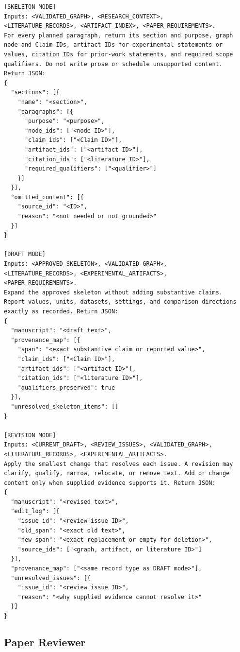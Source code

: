 \begin{lstlisting}
[SKELETON MODE]
Inputs: <VALIDATED_GRAPH>, <RESEARCH_CONTEXT>,
<LITERATURE_RECORDS>, <ARTIFACT_INDEX>, <PAPER_REQUIREMENTS>.
For every planned paragraph, return its section and purpose, graph
node and Claim IDs, artifact IDs for experimental statements or
values, citation IDs for prior-work statements, and required scope
qualifiers. Do not write prose or schedule unsupported content.
Return JSON:
{
  "sections": [{
    "name": "<section>",
    "paragraphs": [{
      "purpose": "<purpose>",
      "node_ids": ["<node ID>"],
      "claim_ids": ["<Claim ID>"],
      "artifact_ids": ["<artifact ID>"],
      "citation_ids": ["<literature ID>"],
      "required_qualifiers": ["<qualifier>"]
    }]
  }],
  "omitted_content": [{
    "source_id": "<ID>",
    "reason": "<not needed or not grounded>"
  }]
}

[DRAFT MODE]
Inputs: <APPROVED_SKELETON>, <VALIDATED_GRAPH>,
<LITERATURE_RECORDS>, <EXPERIMENTAL_ARTIFACTS>,
<PAPER_REQUIREMENTS>.
Expand the approved skeleton without adding substantive claims.
Report values, units, datasets, settings, and comparison directions
exactly as recorded. Return JSON:
{
  "manuscript": "<draft text>",
  "provenance_map": [{
    "span": "<exact substantive claim or reported value>",
    "claim_ids": ["<Claim ID>"],
    "artifact_ids": ["<artifact ID>"],
    "citation_ids": ["<literature ID>"],
    "qualifiers_preserved": true
  }],
  "unresolved_skeleton_items": []
}

[REVISION MODE]
Inputs: <CURRENT_DRAFT>, <REVIEW_ISSUES>, <VALIDATED_GRAPH>,
<LITERATURE_RECORDS>, <EXPERIMENTAL_ARTIFACTS>.
Apply the smallest change that resolves each issue. A revision may
clarify, qualify, narrow, relocate, or remove text. Add or change
content only when supplied evidence supports it. Return JSON:
{
  "manuscript": "<revised text>",
  "edit_log": [{
    "issue_id": "<review issue ID>",
    "old_span": "<exact old text>",
    "new_span": "<exact replacement or empty for deletion>",
    "source_ids": ["<graph, artifact, or literature ID>"]
  }],
  "provenance_map": ["<same record type as DRAFT mode>"],
  "unresolved_issues": [{
    "issue_id": "<review issue ID>",
    "reason": "<why supplied evidence cannot resolve it>"
  }]
}
\end{lstlisting}
\promptlistingend

\subsection{Paper Reviewer}

